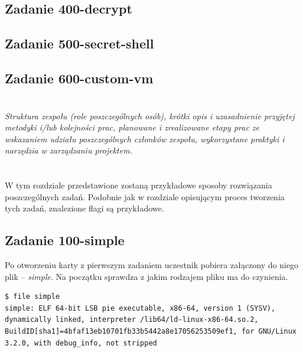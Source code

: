 \documentclass[polish,12pt]{aghthesis}
\begin{document}
\subsection{Zadanie 400-decrypt}

\subsection{Zadanie 500-secret-shell}

\subsection{Zadanie 600-custom-vm}

\clearpage

\section{\SectionTitleWorkOrganization}
\label{sec:organizacja-pracy}
\emph{Struktura zespołu (role poszczególnych osób), krótki opis i
    uzasadnienie przyjętej metodyki i/lub kolejności prac, planowane i
    zrealizowane etapy prac ze wskazaniem udziału poszczególnych
    członków zespołu, wykorzystane praktyki i narzędzia w zarządzaniu
    projektem.}

\clearpage

\section{\SectionTitleResults}
\label{sec:wyniki-projektu}

W tym rozdziale przedstawione zostaną przykładowe sposoby rozwiązania poszczególnych zadań.
Podobnie jak w rozdziale opisującym proces tworzenia tych zadań, znalezione
flagi są przykładowe.

\subsection{Zadanie 100-simple}

Po otworzeniu karty z pierwszym zadaniem uczestnik pobiera załączony do niego
plik -- \emph{simple}.
Na początku sprawdza z jakim rodzajem pliku ma do czynienia.

\begin{verbatim}
$ file simple
simple: ELF 64-bit LSB pie executable, x86-64, version 1 (SYSV), dynamically linked, interpreter /lib64/ld-linux-x86-64.so.2, BuildID[sha1]=4bfaf13eb10701fb33b5442a8e17056253509ef1, for GNU/Linux 3.2.0, with debug_info, not stripped
\end{verbatim}
\end{document}
